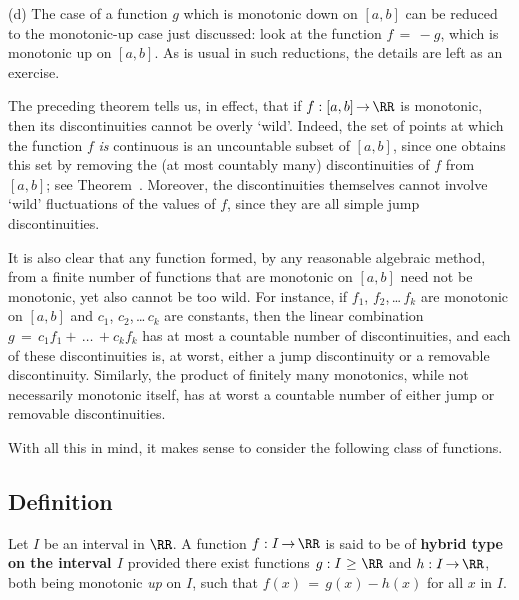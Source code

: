 \V

        (d) The case of a function $g$ which is monotonic down on $[a,b]$ can be reduced to the monotonic-up case just discussed:
    look at the function $f \,=\, -g$, which is monotonic up on $[a,b]$.
    As is usual in such reductions, the details are left as an exercise.

\V
\V


        The preceding theorem tells us, in effect, that if $f:[a,b] \,{\rightarrow}\, {\RR}$ is monotonic, then its discontinuities cannot be overly `wild'.
    Indeed, the set of points at which the function $f$ {\em is} continuous is an uncountable subset of $[a,b]$,
    since one obtains this set by removing the (at most countably many) discontinuities of $f$ from $[a,b]$;
     see Theorem~.
    Moreover, the discontinuities themselves cannot involve `wild' fluctuations of the values of $f$, since they are all simple jump discontinuities.

        It is also clear that any function formed, by any reasonable algebraic method, from a finite number of functions that are monotonic on $[a,b]$ need not be monotonic, yet also cannot be too wild.
    For instance, if $f_{1}$, $f_{2}$,\,{\ldots}\,$f_{k}$ are monotonic on $[a,b]$ and $c_{1}$, $c_{2}$,\,{\ldots}\,$c_{k}$ are constants,
    then the linear combination $g \,=\, c_{1}f_{1} +\,{\ldots}\,+c_{k}f_{k}$ has at most a countable number of discontinuities, and each of these discontinuities is,
    at worst, either a jump discontinuity or a removable discontinuity. Similarly, the product of finitely many monotonics,
    while not necessarily monotonic itself, has at worst a countable number of either jump or removable discontinuities.

        With all this in mind, it makes sense to consider the following class of functions.

\V
\V

             \subsection{\small{\bf Definition}}
            \label{DefF40.80}

        Let $I$ be an interval in ${\RR}$.
    A function $f:I \,{\rightarrow}\, {\RR}$ is said to be of {\bf hybrid type on the interval $I$} provided there exist functions $g:I\,\,{\geq}\,\,{\RR}$ and $h:I \,{\rightarrow}\, {\RR}$,
    both being monotonic {\em up} on $I$, such that $f(x) \,=\, g(x)-h(x)$ for all $x$ in $I$.

